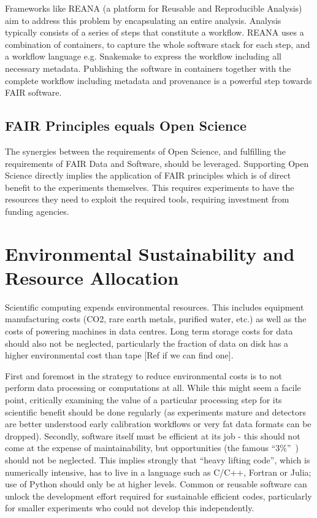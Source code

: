 Frameworks like REANA (a platform for Reusable and Reproducible Analysis) aim to address this problem by encapsulating an entire analysis.  Analysis typically consists of a series of steps that constitute a workflow.  REANA uses a combination of containers, to capture the whole software stack for each step, and a workflow language e.g. Snakemake to express the workflow including all necessary metadata. Publishing the software in containers together with the complete workflow including metadata and provenance is a powerful step towards FAIR software.


\subsection{FAIR Principles equals Open Science}

The synergies between the requirements of Open Science, and fulfilling the requirements of FAIR Data and Software, should be leveraged.  Supporting Open Science directly implies the application of FAIR principles which is of direct benefit to the experiments themselves. This requires experiments to have the resources they need to exploit the required tools, requiring investment from funding agencies.


\section{Environmental Sustainability and Resource Allocation}

Scientific computing expends environmental resources. This includes equipment manufacturing costs (CO2, rare earth metals, purified water, etc.) as well as the costs of powering machines in data centres. Long term storage costs for data should also not be neglected, particularly the fraction of data on disk has a higher environmental cost than tape [Ref if we can find one]. 

First and foremost in the strategy to reduce environmental costs is to not perform data processing or computations at all. While this might seem a facile point, critically examining the value of a particular processing step for its scientific benefit should be done regularly (as experiments mature and detectors are better understood early calibration workflows or very fat data formats can be dropped). Secondly, software itself must be efficient at its job - this should not come at the expense of maintainability, but opportunities (the famous ``3\%''~\cite{10.1145/356635.356640}) should not be neglected. This implies strongly that ``heavy lifting code'', which is numerically intensive, has to live in a language such as C/C++, Fortran or Julia; use of Python should only be at higher levels. Common or reusable software can unlock the development effort required for sustainable efficient codes, particularly for smaller experiments who could not develop this independently.

